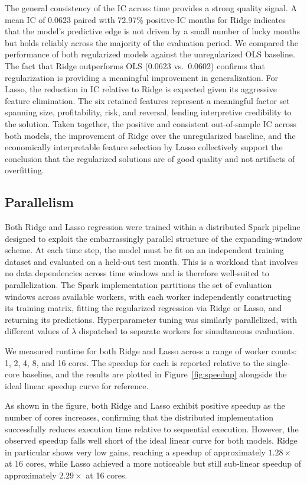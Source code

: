 \documentclass[11pt]{article}
\begin{document}
The general consistency of the IC across time provides a strong quality signal. A mean IC of 0.0623 paired with 72.97\% positive-IC months for Ridge indicates that the model's predictive edge is not driven by a small number of lucky months but holds reliably across the majority of the evaluation period. We compared the performance of both regularized models against the unregularized OLS baseline. The fact that Ridge outperforms OLS (0.0623 vs.\ 0.0602) confirms that regularization is providing a meaningful improvement in generalization. For Lasso, the reduction in IC relative to Ridge is expected given its aggressive feature elimination. The six retained features represent a meaningful factor set spanning size, profitability, risk, and reversal, lending interpretive credibility to the solution. Taken together, the positive and consistent out-of-sample IC across both models, the improvement of Ridge over the unregularized baseline, and the economically interpretable feature selection by Lasso collectively support the conclusion that the regularized solutions are of good quality and not artifacts of overfitting.

\subsection{Parallelism}

Both Ridge and Lasso regression were trained within a distributed Spark pipeline designed to exploit the embarrassingly parallel structure of the expanding-window scheme. At each time step, the model must be fit on an independent training dataset and evaluated on a held-out test month. This is a workload that involves no data dependencies across time windows and is therefore well-suited to parallelization. The Spark implementation partitions the set of evaluation windows across available workers, with each worker independently constructing its training matrix, fitting the regularized regression via Ridge or Lasso, and returning its predictions. Hyperparameter tuning was similarly parallelized, with different values of $\lambda$ dispatched to separate workers for simultaneous evaluation.

We measured runtime for both Ridge and Lasso across a range of worker counts: 1, 2, 4, 8, and 16 cores. The speedup for each is reported relative to the single-core baseline, and the results are plotted in Figure~\ref{fig:speedup} alongside the ideal linear speedup curve for reference.

As shown in the figure, both Ridge and Lasso exhibit positive speedup as the number of cores increases, confirming that the distributed implementation successfully reduces execution time relative to sequential execution. However, the observed speedup falls well short of the ideal linear curve for both models. Ridge in particular shows very low gains, reaching a speedup of approximately $1.28\times$ at 16 cores, while Lasso achieved a more noticeable but still sub-linear speedup of approximately $2.29\times$ at 16 cores.
\end{document}
